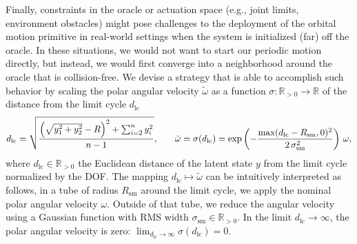Finally, constraints in the oracle or actuation space (e.g., joint limits, environment obstacles) might pose challenges to the deployment of the orbital motion primitive in real-world settings when the system is initialized (far) off the oracle.
In these situations, we would not want to start our periodic motion directly, but instead, we would first converge into a neighborhood around the oracle that is collision-free. We devise a strategy that is able to accomplish such behavior by scaling the polar angular velocity $\tilde{\omega}$ as a function $\sigma: \mathbb{R}_{>0} \to \mathbb{R}$ of the distance from the limit cycle $d_\mathrm{lc}$
\begin{equation}\small
    d_\mathrm{lc} = \sqrt{\frac{\left (\sqrt{y_1^2 + y_2^2} - R \right)^2 + \sum_{i=2}^{n} y_i^2}{n-1}},
    \qquad
    \tilde{\omega} = \sigma(d_\mathrm{lc}) = \exp \left ( - \frac{\max(d_\mathrm{lc} - R_\mathrm{sm}, 0)^2}{2 \, \sigma_\mathrm{sm}^2} \right ) \, \omega,
\end{equation}
where $d_\mathrm{lc} \in \mathbb{R}_{>0}$ the Euclidean distance of the latent state $y$ from the limit cycle normalized by the DOF.
The mapping $d_\mathrm{lc} \mapsto \tilde{\omega}$ can be intuitively interpreted as follows, in a tube of radius $R_\mathrm{sm}$ around the limit cycle, we apply the nominal polar angular velocity $\omega$. Outside of that tube, we reduce the angular velocity using a Gaussian function with RMS width $\sigma_\mathrm{sm} \in \mathbb{R}_{>0}$. In the limit $d_\mathrm{lc} \to \infty$, the polar angular velocity is zero: $\lim_{d_\mathrm{lc} \to \infty} \sigma(d_\mathrm{lc}) = 0$.


